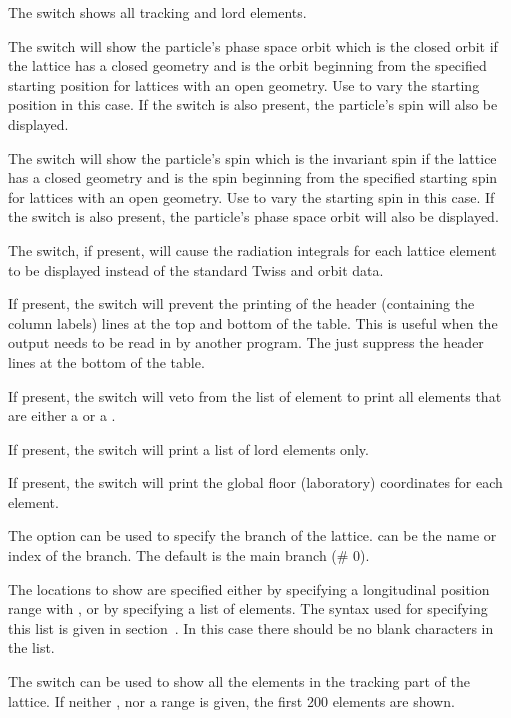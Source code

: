 {{{{{The  switch shows all tracking and lord elements.

The  switch will show the particle's phase space orbit which is the closed orbit if the
lattice has a closed geometry and is the orbit beginning from the specified starting position for
lattices with an open geometry. Use  to vary the starting position in this
case. If the  switch is also present, the particle's spin will also be displayed.

The  switch will show the particle's spin which is the invariant spin if the lattice has a
closed geometry and is the spin beginning from the specified starting spin for lattices with an open
geometry. Use  to vary the starting spin in this case. If the  switch
is also present, the particle's phase space orbit will also be displayed.

The  switch, if present, will cause the radiation integrals for
each lattice element to be displayed instead of the standard Twiss and orbit data.

If present, the  switch will prevent the printing of the header
(containing the column labels) lines at the top and bottom of the table.  This is useful
when the output needs to be read in by another program. The  just
suppress the header lines at the bottom of the table.

If present, the  switch will veto from the list of element to print all
elements that are either a  or a .

If present, the  switch will print a list of lord elements only.

If present, the  switch will print the global floor (laboratory)
coordinates for each element.

The  option can be used to specify the branch of the
lattice.  can be the name or index of the branch.  The default is the
main branch (\# 0).

The locations to show are specified either by specifying a longitudinal position range
with , or by specifying a list  of elements.  The syntax used
for specifying this list is given in section~.  In this case there
should be no blank characters in the list.

The  switch can be used to show all the elements in the tracking
part of the lattice. If neither , nor a range is given, the first
200 elements are shown.

}}}}}
